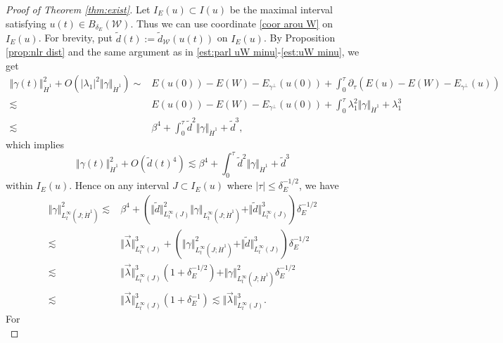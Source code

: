 \documentclass[reqno, 11pt]{amsart}
\numberwithin{equation}{section}
\theoremstyle{plain}
\theoremstyle{definition}
\numberwithin{equation}{section}
\numberwithin{theorem}{section}
\numberwithin{equation}{section}
\numberwithin{equation}{section}
\numberwithin{theorem}{section}
\begin{document}
\begin{proof}[Proof of Theorem \ref{thm:exist}]
		Let $I_E(u)\subset I(u)$ be the maximal interval satisfying $u(t)\in B_{\delta_{E}}(\mathcal{W})$. Thus we can use coordinate \eqref{coor arou W} on $I_E(u)$. For brevity, put $\widetilde{d}(t):=\widetilde{d}_{\mathcal{W}}(u(t))$ on $I_E(u)$.  By Proposition \ref{prop:nlr dist} and the same argument as in \eqref{est:parl uW minu}-\eqref{est:uW minu}, we get
		\begin{equation*}
		\begin{aligned}
		\Vert \gamma(t) \Vert_{\dot H^1}^2+O(|\lambda_{1}|^2\Vert\gamma \Vert_{\dot H^{1}})\sim& E(u(0))-E(W)-E_{\gamma^{\bot}}(u(0))+\int_{0}^{\tau}\partial_{\tau}\left(E(u)-E(W)-E_{\gamma^{\bot}}(u)\right)\\\lesssim& E(u(0))-E(W)-E_{\gamma^{\bot}}(u(0))+\int_{0}^{\tau}\lambda_{1}^2\Vert\gamma \Vert_{\dot H^{1}}+\lambda_{1}^3\\\lesssim&\beta^4+\int_{0}^{\tau} \widetilde{d}^2\Vert \gamma \Vert_{\dot H^{1}}+\widetilde{d}^3,
		\end{aligned}
		\end{equation*}
		which implies 
		\begin{equation*}
		\Vert \gamma(t) \Vert_{\dot H^1}^2+O(\widetilde{d}(t)^4)\lesssim \beta^4+\int_{0}^{\tau} \widetilde{d}^2\Vert \gamma \Vert_{\dot H^{1}}+\widetilde{d}^3  
		\end{equation*}
		within $I_E(u)$. Hence on any interval $J\subset I_E(u)$ where $|\tau|\leq \delta_{E}^{-1/2}$, we have 
		\begin{equation}\label{est:H1 gam}
		\begin{aligned}
		\Vert \gamma \Vert_{L_{t}^{\infty}(J;\dot H^1)}^2\lesssim&\beta^4+\left( \Vert\widetilde{d}\Vert_{L_{t}^{\infty}(J)}^2\Vert\gamma\Vert_{L_{t}^{\infty}(J;\dot H^1)}+\Vert\widetilde{d}\Vert_{L_{t}^{\infty}(J)}^3\right)\delta_{E}^{-1/2}\\\lesssim&\Vert\vec{\lambda}\Vert_{L_{t}^{\infty}(J)}^3+\left( \Vert\gamma\Vert_{L_{t}^{\infty}(J;\dot H^1)}^2+\Vert\widetilde{d}\Vert_{L_{t}^{\infty}(J)}^3\right)\delta_{E}^{-1/2}\\\lesssim&\Vert\vec{\lambda}\Vert_{L_{t}^{\infty}(J)}^3\left(1+\delta_{E}^{-1/2}\right)+\Vert\gamma\Vert_{L_{t}^{\infty}(J;\dot H^1)}^2\delta_{E}^{-1/2}\\\lesssim&\Vert\vec{\lambda}\Vert_{L_{t}^{\infty}(J)}^3\left(1+\delta_{E}^{-1}\right)\lesssim\Vert\vec{\lambda}\Vert_{L_{t}^{\infty}(J)}^3.
		\end{aligned}
		\end{equation}
		For
		\begin{equation}\label{hyper valid}

\end{equation}
\end{proof}
\end{document}
